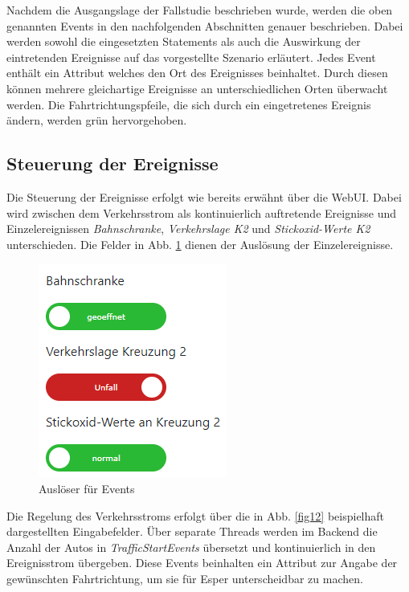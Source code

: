 Nachdem die Ausgangslage der Fallstudie beschrieben wurde, werden die oben genannten Events in den nachfolgenden Abschnitten genauer beschrieben. Dabei werden sowohl die eingesetzten Statements als auch die Auswirkung der eintretenden Ereignisse auf das vorgestellte Szenario erläutert. Jedes Event enthält ein Attribut welches den Ort des Ereignisses beinhaltet. Durch diesen können mehrere gleichartige Ereignisse an unterschiedlichen Orten überwacht werden. Die Fahrtrichtungspfeile, die sich durch ein eingetretenes Ereignis ändern, werden grün hervorgehoben.

\subsection{Steuerung der Ereignisse}
Die Steuerung der Ereignisse erfolgt wie bereits erwähnt über die WebUI. Dabei wird zwischen dem Verkehrsstrom als kontinuierlich auftretende Ereignisse und Einzelereignissen \textit{Bahnschranke}, \textit{Verkehrslage K2} und \textit{Stickoxid-Werte K2} unterschieden. Die Felder in Abb. \ref{fig5} dienen der Auslösung der Einzelereignisse.

\begin{figure}[ht]
\begin{center}
	\includegraphics[scale=0.7]{images/EventTrigger.png}
	\caption{Auslöser für Events}
	\label{fig5}
\end{center}
\end{figure}

Die Regelung des Verkehrsstroms erfolgt über die in Abb. \ref{fig12} beispielhaft dargestellten Eingabefelder. Über separate Threads werden im Backend die Anzahl der Autos in \textit{TrafficStartEvents} übersetzt und kontinuierlich in den Ereignisstrom übergeben. Diese Events beinhalten ein Attribut zur Angabe der gewünschten Fahrtrichtung, um sie für Esper unterscheidbar zu machen.

